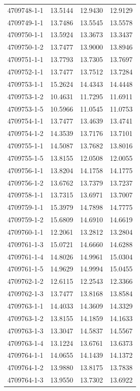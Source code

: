 \begin{longtable}{lrrr}
4709748-1-1 & 13.5144 & 12.9430 & 12.9129 \\
4709749-1-1 & 13.7486 & 13.5545 & 13.5578 \\
4709750-1-1 & 13.5924 & 13.3673 & 13.3437 \\
4709750-1-2 & 13.7477 & 13.9000 & 13.8946 \\
4709751-1-1 & 13.7793 & 13.7305 & 13.7697 \\
4709752-1-1 & 13.7477 & 13.7512 & 13.7284 \\
4709753-1-1 & 15.2624 & 14.4343 & 14.4448 \\
4709753-1-2 & 10.4631 & 11.7295 & 11.6911 \\
4709753-1-5 & 10.5966 & 11.0545 & 11.0753 \\
4709754-1-1 & 13.7477 & 13.4639 & 13.4741 \\
4709754-1-2 & 14.3539 & 13.7176 & 13.7101 \\
4709755-1-1 & 14.5087 & 13.7682 & 13.8016 \\
4709755-1-5 & 13.8155 & 12.0508 & 12.0055 \\
4709756-1-1 & 13.8204 & 14.1758 & 14.1775 \\
4709756-1-2 & 13.6762 & 13.7379 & 13.7237 \\
4709758-1-1 & 13.7315 & 13.6971 & 13.7007 \\
4709759-1-1 & 15.3979 & 14.7898 & 14.7775 \\
4709759-1-2 & 15.6809 & 14.6910 & 14.6619 \\
4709760-1-1 & 12.2061 & 13.2812 & 13.2804 \\
4709761-1-3 & 15.0721 & 14.6660 & 14.6288 \\
4709761-1-4 & 14.8026 & 14.9961 & 15.0304 \\
4709761-1-5 & 14.9629 & 14.9994 & 15.0455 \\
4709762-1-2 & 12.6115 & 12.2543 & 12.3366 \\
4709762-1-3 & 13.7477 & 13.8168 & 13.8584 \\
4709763-1-1 & 14.4033 & 14.3609 & 14.3329 \\
4709763-1-2 & 13.8155 & 14.1859 & 14.1633 \\
4709763-1-3 & 13.3047 & 14.5837 & 14.5567 \\
4709763-1-4 & 13.1224 & 13.6761 & 13.6373 \\
4709764-1-1 & 14.0655 & 14.1439 & 14.1372 \\
4709764-1-2 & 13.9880 & 13.8175 & 13.7838 \\
4709764-1-3 & 13.9550 & 13.7302 & 13.6922 \\

\end{longtable}
